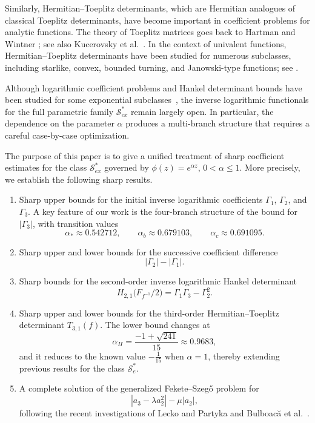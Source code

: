 \documentclass[10pt,a4paper]{amsart}
\numberwithin{equation}{section}
\begin{document}
Similarly, Hermitian--Toeplitz determinants, which are Hermitian analogues of classical Toeplitz determinants, have become important in coefficient problems for analytic functions. The theory of Toeplitz matrices goes back to Hartman and Wintner \cite{HW}; see also Kucerovsky et al.\ \cite{KMS}. In the context of univalent functions, Hermitian--Toeplitz determinants have been studied for numerous subclasses, including starlike, convex, bounded turning, and Janowski-type functions; see \cite{Ali,C,K3,KKD2023,KPR,KumarCho2021,KSC,GJSS2023,TKBSKS2025,UFBCL2025}.

Although logarithmic coefficient problems and Hankel determinant bounds have been studied for some exponential subclasses~\cite{Panja2026}, the inverse logarithmic functionals for the full parametric family $\mathcal{S}_{ex}^{\ast}$ remain largely open. In particular, the dependence on the parameter $\alpha$ produces a multi-branch structure that requires a careful case-by-case optimization.

The purpose of this paper is to give a unified treatment of sharp coefficient estimates for the class $\mathcal{S}_{ex}^{\ast}$ governed by $\phi(z)=e^{\alpha z}$, $0<\alpha\le1$. More precisely, we establish the following sharp results.

\begin{enumerate}
\item Sharp upper bounds for the initial inverse logarithmic coefficients $\Gamma_1$, $\Gamma_2$, and $\Gamma_3$. A key feature of our work is the four-branch structure of the bound for $|\Gamma_3|$, with transition values
\[
\alpha_* \approx 0.542712,\qquad
\alpha_b \approx 0.679103,\qquad
\alpha_c \approx 0.691095.
\]

\item Sharp upper and lower bounds for the successive coefficient difference
\[
|\Gamma_2|-|\Gamma_1|.
\]

\item Sharp bounds for the second-order inverse logarithmic Hankel determinant
\[
H_{2,1}\bigl(F_{f^{-1}}/2\bigr)
=
\Gamma_1\Gamma_3-\Gamma_2^2.
\]

\item Sharp upper and lower bounds for the third-order Hermitian--Toeplitz determinant $T_{3,1}(f)$. The lower bound changes at
\[
\alpha_H = \frac{-1+\sqrt{241}}{15} \approx 0.9683,
\]
and it reduces to the known value $-\frac{1}{15}$ when $\alpha=1$, thereby extending previous results for the class $\mathcal{S}_e^*$.

\item A complete solution of the generalized Fekete--Szeg\H{o} problem for
\[
|a_3-\lambda a_2^2|-\mu|a_2|,
\]
following the recent investigations of Lecko and Partyka \cite{Lecko2024} and Bulboac\u{a} et al.\ \cite{Bulboaca2025}.
\end{enumerate}
\end{document}
